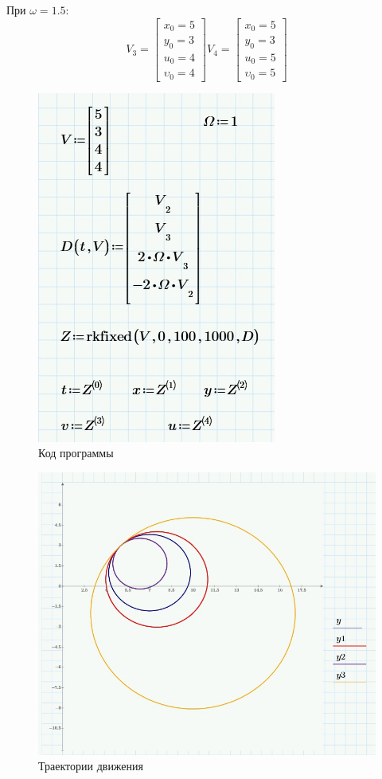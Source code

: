 \documentclass[a4paper, 14pt]{extarticle}
\begin{document}
		При $\omega = 1.5$:
		\[
			V_3 = \begin{bmatrix}x_0=5\\y_0=3\\u_0=4\\\upsilon_0=4\end{bmatrix}
			V_4 = \begin{bmatrix}x_0=5\\y_0=3\\u_0=5\\\upsilon_0=5\end{bmatrix}
		\]
		\begin{figure}[H]
			\centering
			\includegraphics[width = .7\linewidth]{4.jpg}
			\caption{Код программы}
		\end{figure}
		\begin{figure}[H]
			\centering
			\includegraphics[width = \linewidth]{1.jpg}
			\caption{Траектории движения}
		\end{figure}
\end{document}

